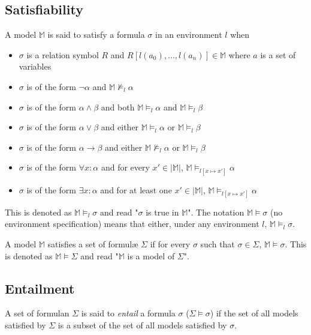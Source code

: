 	\subsection{Satisfiability}

		A model $\mathbb{M}$ is said to satisfy a formula $\sigma$ in an
		environment $l$ when
		\begin{itemize}
		\item $\sigma$ is a relation symbol $R$ and $R[l(a_0) , \ldots , l(a_n)] \in \mathbb{M}$ where $a$ is a set of variables
		\item $\sigma$ is of the form $\neg\alpha$ and $\mathbb{M} \not\models_l \alpha$
		\item $\sigma$ is of the form $\alpha\wedge\beta$ and both $\mathbb{M} \models_l \alpha$ and $\mathbb{M} \models_l \beta$
		\item $\sigma$ is of the form $\alpha\vee\beta$ and either $\mathbb{M} \models_l \alpha$ or $\mathbb{M} \models_l \beta$
		\item $\sigma$ is of the form $\alpha\to\beta$ and either $\mathbb{M} \not\models_l \alpha$ or $\mathbb{M} \models_l \beta$
		\item $\sigma$ is of the form $\forall x : \alpha$  and for every $x' \in |\mathbb{M}|$, $\mathbb{M} \models_{l[x \mapsto x']} \alpha$
		\item $\sigma$ is of the form $\exists x : \alpha$  and for at least one $x' \in |\mathbb{M}|$, $\mathbb{M} \models_{l[x \mapsto x']} \alpha$
		\end{itemize}
		This is denoted as $\mathbb{M} \models_l \sigma$ and read "$\sigma$ is
		true in $\mathbb{M}$". The notation $\mathbb{M} \models \sigma$ (no
		environment specification) means that either, under any environment
		$l$, $\mathbb{M} \models_l \sigma$.

		A model $\mathbb{M}$ satisfies a set of formul{\ae} $\Sigma$ if for every
		$\sigma$ such that $\sigma \in \Sigma$, $\mathbb{M} \models \sigma$.
		This is denoted as $\mathbb{M} \models \Sigma$ and read "$\mathbb{M}$
		is a model of $\Sigma$".

	\subsection{Entailment}

		A set of formulan $\Sigma$ is said to \emph{entail} a formula $\sigma$
		($\Sigma \models \sigma$) if the set of all models satisfied by
		$\Sigma$ is a subset of the set of all models satisfied by $\sigma$.

